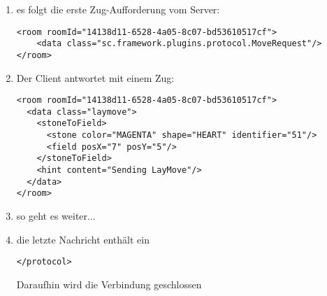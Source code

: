 \documentclass[12pt,a4paper, ngerman, oneside]{scrartcl}
\begin{document}
\begin{enumerate}
\item es folgt die erste Zug-Aufforderung vom Server: \begin{verbatim}
<room roomId="14138d11-6528-4a05-8c07-bd53610517cf">
    <data class="sc.framework.plugins.protocol.MoveRequest"/>
</room>
\end{verbatim}
\item Der Client antwortet mit einem Zug: \begin{verbatim}
<room roomId="14138d11-6528-4a05-8c07-bd53610517cf">
  <data class="laymove">
    <stoneToField>
      <stone color="MAGENTA" shape="HEART" identifier="51"/>
      <field posX="7" posY="5"/>
    </stoneToField>
    <hint content="Sending LayMove"/>
  </data>
</room>
\end{verbatim}
\item so geht es weiter...
\item die letzte Nachricht enthält ein \begin{verbatim}
</protocol>
\end{verbatim}
Daraufhin wird die Verbindung geschlossen
\end{enumerate}
\end{document}
